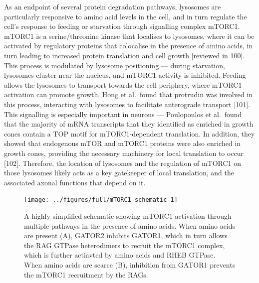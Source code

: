\documentclass[
  12pt,
  a4paper,
]{book}
\begin{document}
As an endpoint of several protein degradation pathways, lysosomes are particularly responsive to amino acid levels in the cell, and in turn regulate the cell's response to feeding or starvation through signalling complex mTORC1. mTORC1 is a serine/threonine kinase that localises to lysosomes, where it can be activated by regulatory proteins that colocalise in the presence of amino acids, in turn leading to increased protein translation and cell growth {[}reviewed in 100{]}. This process is modulated by lysosome positioning --- during starvation, lysosomes cluster near the nucleus, and mTORC1 activity is inhibited. Feeding allows the lysosomes to transport towards the cell periphery, where mTORC1 activation can promote growth. Hong et al.~found that protrudin was involved in this process, interacting with lysosomes to facilitate anterograde transport {[}101{]}. This signalling is especially important in neurons --- Poulopoulos et al.~found that the majority of mRNA transcripts that they identified as enriched in growth cones contain a TOP motif for mTORC1-dependent translation. In addition, they showed that endogenous mTOR and mTORC1 proteins were also enriched in growth cones, providing the necessary machinery for local translation to occur {[}102{]}. Therefore, the location of lysosomes and the regulation of mTORC1 on those lysosomes likely acts as a key gatekeeper of local translation, and the associated axonal functions that depend on it.

\begin{figure}
\texttt{[image: ../figures/full/mTORC1-schematic-1]} \caption[mTORC1 activation schematic]{A highly simplified schematic showing mTORC1 activation through multiple pathways in the presence of amino acids.  When amino acids are present (A), GATOR2 inhibits GATOR1, which in turn allows the RAG GTPase heterodimers to recruit the mTORC1 complex, which is further actiavted by amino acids and RHEB GTPase.  When amino acids are scarce (B), inhibition from GATOR1 prevents the mTORC1 recruitment by the RAGs.}\label{fig:mTORC1-schematic}
\end{figure}
\end{document}
